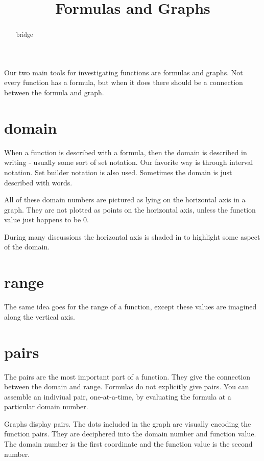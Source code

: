 \documentclass{ximera}
\title{Formulas and Graphs}
\begin{document}
\begin{abstract}
bridge
\end{abstract}
\maketitle



Our two main tools for investigating functions are formulas and graphs. Not every function has a formula, but when it does there should be a connection between the formula and graph.

\section{domain}
When a function is described with a formula, then the domain is described in writing - usually some sort of set notation.  Our favorite way is through interval notation.  Set builder notation is also used.  Sometimes the domain is just described with words.

All of these domain numbers are pictured as lying on the horizontal axis in a graph.  They are not plotted as points on the horizontal axis, unless the function value just happens to be $0$.

During many discussions the horizontal axis is shaded in to highlight some aspect of the domain.







\section{range}
The same idea goes for the range of a function, except these values are imagined along the vertical axis.








\section{pairs}
The pairs are the most important part of a function.  They give the connection between the domain and range.  Formulas do not explicitly give pairs. You can assemble an indiviual pair, one-at-a-time, by evaluating the formula at a particular domain number.

Graphs display pairs.  The dots included in the graph are visually encoding the function pairs.  They are deciphered into the domain number and function value. The domain number is the first coordinate and the function value is the second number.
\end{document}
